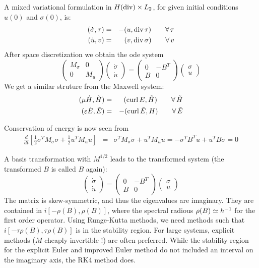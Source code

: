 A mixed variational formulation in $H(\operatorname{div}) \times L_2$, for
given initial conditions $u(0)$ and $\sigma(0)$, is:
\begin{eqnarray*}
(\dot \sigma, \tau) & = & - (u, \operatorname{div} \tau) \qquad \forall \, \tau \\
(\dot u, v) & = & (v, \operatorname{div} \sigma) \qquad \forall \, v
\end{eqnarray*}
After space discretization we obtain the ode system
$$
\left( \begin{array}{cc}
 M_\sigma  & 0 \\
0 & M_u 
\end{array} \right) 
\left( \begin{array}{c} \dot \sigma \\ \dot u \end{array} \right) = 
\left( \begin{array}{cc}
0 & -B^T \\
B & 0
\end{array} \right) 
\left( \begin{array}{c} \sigma \\ u \end{array} \right) 
$$
We get a similar struture from the Maxwell system:
\begin{eqnarray*}
(\mu \dot H, \tilde H) & = & (\operatorname{curl} E, \tilde H)  \qquad \forall \, \tilde H \\
(\varepsilon \dot E, \tilde E) & = & -(\operatorname{curl} \tilde E, H) \qquad \forall \, \tilde E
\end{eqnarray*}

Conservation of energy is now seen from
\begin{eqnarray*}
\frac{d}{dt} \left[  \tfrac{1}{2}  \sigma^T M_\sigma \sigma + \tfrac{1}{2} u^T M_u u \right] 
& = & \sigma^T M_\sigma \dot \sigma + u^T M_u \dot u = -\sigma^T B^T u + u^T B \sigma = 0
\end{eqnarray*}

A basis transformation with $M^{1/2}$ leads to the transformed system (the transformed $B$ is called $B$ again):
$$
\left( \begin{array}{c} \dot \sigma \\ \dot u \end{array} \right) = 
\left( \begin{array}{cc}
0 & -B^T \\
B & 0
\end{array} \right) 
\left( \begin{array}{c} \sigma \\ u \end{array} \right) 
$$
The matrix is skew-symmetric, and thus the eigenvalues are imaginary. They are contained in $i \left[ -\rho(B), \rho(B) \right]$, where the spectral radious $\rho(B) \simeq h^{-1}$ for the first order operator. Using Runge-Kutta methods, we need methods such that $i \left[ -\tau \rho(B), \tau \rho(B) \right]$ is in the stability region. For large systems, explicit methods ($M$ cheaply invertible !) are often preferred. While the stability region for the explicit Euler and improved Euler method do not included an interval on the imaginary axis, the RK4 method does.

